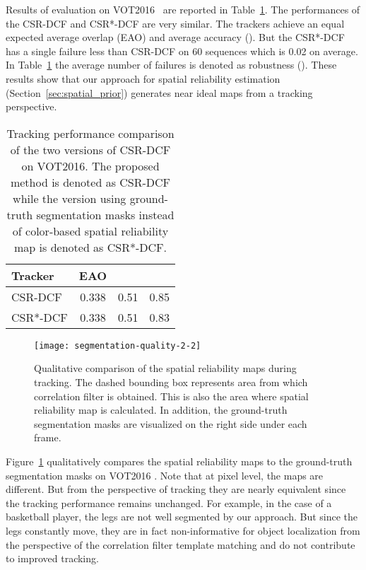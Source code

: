 \documentclass[twocolumn]{article}
\begin{document}
Results of evaluation on VOT2016~\citep{kristan_vot2016} are reported in Table~\ref{tab:segmentation-quality}. The performances of the CSR-DCF and CSR*-DCF are very similar. The trackers achieve an equal expected average overlap (EAO) and average accuracy (). But the CSR*-DCF has a single failure less than CSR-DCF on 60 sequences which is 0.02 on average. In Table~\ref{tab:segmentation-quality} the average number of failures is denoted as robustness (). These results show that our approach for spatial reliability estimation (Section~\ref{sec:spatial_prior}) generates near ideal maps from a tracking perspective. 

\begin{table}[t!]\setlength{\tabcolsep}{10pt}
\begin{center}
\caption{Tracking performance comparison of the two versions of CSR-DCF on VOT2016. The proposed method is denoted as CSR-DCF while the version using ground-truth segmentation masks instead of color-based spatial reliability map is denoted as CSR*-DCF.}
\label{tab:segmentation-quality}
\begin{tabular*}{0.8\linewidth}{l c c c}\hline
 Tracker & EAO &  &  \\
\hline
CSR-DCF & 0.338 & 0.51 & 0.85 \\
CSR*-DCF & 0.338 & 0.51 & 0.83 \\
\hline
\end{tabular*}
\end{center}
\end{table}

\begin{figure}[!t]
\centering   
\texttt{[image: segmentation-quality-2-2]}
\caption{Qualitative comparison of the spatial reliability maps during tracking. The dashed bounding box represents area from which correlation filter is obtained. This is also the area where spatial reliability map is calculated. In addition, the ground-truth segmentation masks are visualized on the right side under each frame.}
\label{fig:segmentation-quality}
\end{figure}

Figure~\ref{fig:segmentation-quality} qualitatively compares the spatial reliability maps to the ground-truth segmentation masks on VOT2016 \citep{kristan_vot2016}. Note that at pixel level, the maps are different. But from the perspective of tracking they are nearly equivalent since the tracking performance remains unchanged. For example, in the case of a basketball player, the legs are not well segmented by our approach. But since the legs constantly move, they are in fact non-informative for object localization from the perspective of the correlation filter template matching and do not contribute to improved tracking.
\end{document}
